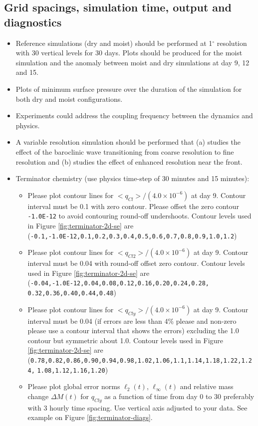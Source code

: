 \documentclass[times,doublespace]{fldauth}
\begin{document}
\subsection{Grid spacings, simulation time, output and diagnostics}

\begin{itemize}
\item Reference simulations (dry and moist) should be performed at 1$^\circ$ resolution with 30 vertical levels for 30 days.  Plots should be produced for the moist simulation and the anomaly between moist and dry simulations at day 9, 12 and 15.
\item Plots of minimum surface pressure over the duration of the simulation for both dry and moist configurations.
\item Experiments could address the coupling frequency between the dynamics and physics.
\item A variable resolution simulation should be performed that (a) studies the effect of the baroclinic wave transitioning from coarse resolution to fine resolution and (b) studies the effect of enhanced resolution near the front.
\item Terminator chemistry (use physics time-step of 30 minutes and 15 minutes): 
\begin{itemize}
\item Please plot contour lines for $<q_{Cl}>/(4.0\times 10^{-6})$ at day 9. Contour interval must be 0.1 with zero contour. Please offset the zero contour \verb+-1.0E-12+ to avoid contouring round-off undershoots. Contour levels used in Figure \ref{fig:terminator-2d-se} are\\
(\verb+-0.1,-1.0E-12,0.1,0.2,0.3,0.4,0.5,0.6,0.7,0.8,0.9,1.0,1.2+)
\item Please plot contour lines for $<q_{Cl2}>/(4.0\times 10^{-6})$ at day 9. Contour interval must be 0.04 with round-off offset zero contour.  Contour levels used in Figure \ref{fig:terminator-2d-se} are\\
(\verb+-0.04,-1.0E-12,0.04,0.08,0.12,0.16,0.20,0.24,0.28,+\\
\verb+0.32,0.36,0.40,0.44,0.48+)
\item Please plot contour lines for $<q_{Cly}>/(4.0\times 10^{-6})$ at day 9. Contour interval must be 0.04 (if errors are less than 4\% please and non-zero please use a contour interval that shows the errors) excluding the 1.0 contour but symmetric about 1.0. Contour levels used in Figure \ref{fig:terminator-2d-se} are\\
(\verb+0.78,0.82,0.86,0.90,0.94,0.98,1.02,1.06,1.1,1.14,1.18,1.22,1.24,+
\verb+1.08,1.12,1.16,1.20+)
\item Please plot global error norms $\ell_2(t)$, $\ell_\infty(t)$ and relative mass change $\Delta M(t)$ for $q_{Cly}$ as a function of time from day 0 to 30 preferably with 3 hourly time spacing. Use vertical axis adjusted to your data. See example on Figure \ref{fig:terminator-diags}.
\end{itemize}
\end{itemize}
\end{document}
